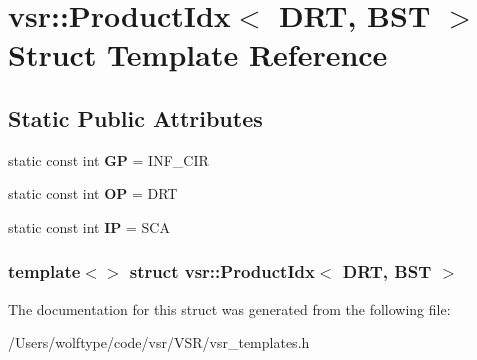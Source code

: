 \hypertarget{structvsr_1_1_product_idx_3_01_d_r_t_00_01_b_s_t_01_4}{\section{vsr\-:\-:Product\-Idx$<$ D\-R\-T, B\-S\-T $>$ Struct Template Reference}
\label{structvsr_1_1_product_idx_3_01_d_r_t_00_01_b_s_t_01_4}
}
\subsection*{Static Public Attributes}
\begin{DoxyCompactItemize}
\item 
\hypertarget{structvsr_1_1_product_idx_3_01_d_r_t_00_01_b_s_t_01_4_a779b449c6329be7cc36f98be62f9bb91}{static const int {\bfseries G\-P} = I\-N\-F\-\_\-\-C\-I\-R}\label{structvsr_1_1_product_idx_3_01_d_r_t_00_01_b_s_t_01_4_a779b449c6329be7cc36f98be62f9bb91}

\item 
\hypertarget{structvsr_1_1_product_idx_3_01_d_r_t_00_01_b_s_t_01_4_af8154390dd93c68bbe2e18b3928b9d7a}{static const int {\bfseries O\-P} = D\-R\-T}\label{structvsr_1_1_product_idx_3_01_d_r_t_00_01_b_s_t_01_4_af8154390dd93c68bbe2e18b3928b9d7a}

\item 
\hypertarget{structvsr_1_1_product_idx_3_01_d_r_t_00_01_b_s_t_01_4_a1f96949857cccc5f65fb6518def30ce8}{static const int {\bfseries I\-P} = S\-C\-A}\label{structvsr_1_1_product_idx_3_01_d_r_t_00_01_b_s_t_01_4_a1f96949857cccc5f65fb6518def30ce8}

\end{DoxyCompactItemize}
\subsubsection*{template$<$$>$ struct vsr\-::\-Product\-Idx$<$ D\-R\-T, B\-S\-T $>$}



The documentation for this struct was generated from the following file\-:\begin{DoxyCompactItemize}
\item 
/\-Users/wolftype/code/vsr/\-V\-S\-R/vsr\-\_\-templates.\-h\end{DoxyCompactItemize}
